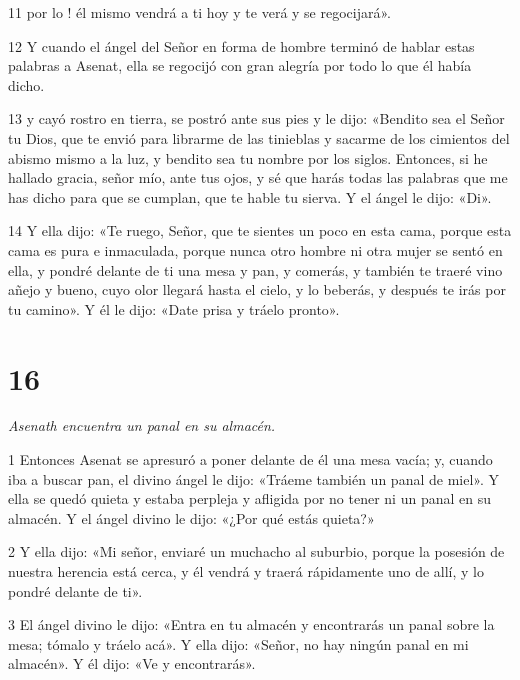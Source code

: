 \par 11 por lo ! él mismo vendrá a ti hoy y te verá y se regocijará».

\par 12 Y cuando el ángel del Señor en forma de hombre terminó de hablar estas palabras a Asenat, ella se regocijó con gran alegría por todo lo que él había dicho.

\par 13 y cayó rostro en tierra, se postró ante sus pies y le dijo: «Bendito sea el Señor tu Dios, que te envió para librarme de las tinieblas y sacarme de los cimientos del abismo mismo a la luz, y bendito sea tu nombre por los siglos. Entonces, si he hallado gracia, señor mío, ante tus ojos, y sé que harás todas las palabras que me has dicho para que se cumplan, que te hable tu sierva. Y el ángel le dijo: «Di».

\par 14 Y ella dijo: «Te ruego, Señor, que te sientes un poco en esta cama, porque esta cama es pura e inmaculada, porque nunca otro hombre ni otra mujer se sentó en ella, y pondré delante de ti una mesa y pan, y comerás, y también te traeré vino añejo y bueno, cuyo olor llegará hasta el cielo, y lo beberás, y después te irás por tu camino». Y él le dijo: «Date prisa y tráelo pronto».

\chapter{16}

\par \textit{Asenath encuentra un panal en su almacén.}

\par 1 Entonces Asenat se apresuró a poner delante de él una mesa vacía; y, cuando iba a buscar pan, el divino ángel le dijo: «Tráeme también un panal de miel». Y ella se quedó quieta y estaba perpleja y afligida por no tener ni un panal en su almacén. Y el ángel divino le dijo: «¿Por qué estás quieta?»

\par 2 Y ella dijo: «Mi señor, enviaré un muchacho al suburbio, porque la posesión de nuestra herencia está cerca, y él vendrá y traerá rápidamente uno de allí, y lo pondré delante de ti».

\par 3 El ángel divino le dijo: «Entra en tu almacén y encontrarás un panal sobre la mesa; tómalo y tráelo acá». Y ella dijo: «Señor, no hay ningún panal en mi almacén». Y él dijo: «Ve y encontrarás».

